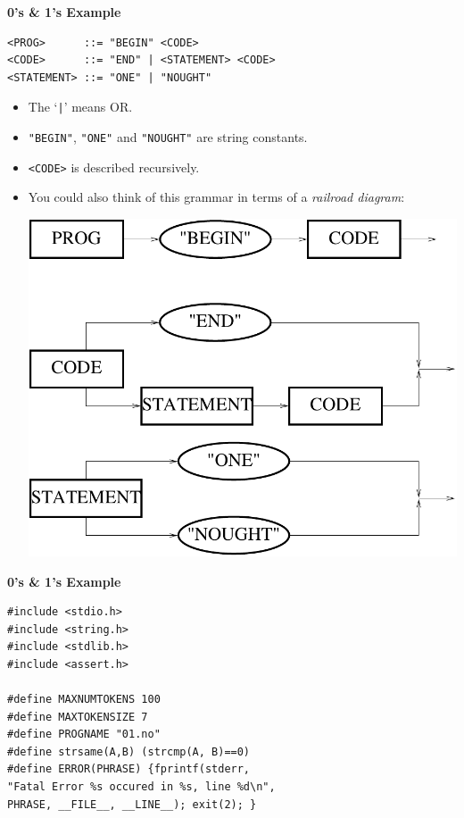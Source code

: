 \documentclass[a4,portraitt]{slides}
\begin{document}
{\newpage
{\samepage
\begin{center}
{\Large{\bf 0's \& 1's Example}}
\end{center}
{\small
\begin{verbatim}
<PROG>      ::= "BEGIN" <CODE>
<CODE>      ::= "END" | <STATEMENT> <CODE>
<STATEMENT> ::= "ONE" | "NOUGHT"
\end{verbatim}
\begin{itemize}
\item The `\verb^|^' means OR.
\item \verb^"BEGIN"^, \verb^"ONE"^ and \verb^"NOUGHT"^ are string constants.
\item \verb^<CODE>^ is described recursively.
\item You could also think of this grammar in terms of a {\it railroad diagram}:
\begin{center}
\includegraphics{../Images/railroad.pdf}
\end{center}
\end{itemize}
}}

\newpage
{\samepage
\begin{center}
{\Large{\bf 0's \& 1's Example}}
\end{center}
\begin{verbatim}
#include <stdio.h>
#include <string.h>
#include <stdlib.h>
#include <assert.h>

#define MAXNUMTOKENS 100
#define MAXTOKENSIZE 7
#define PROGNAME "01.no"
#define strsame(A,B) (strcmp(A, B)==0)
#define ERROR(PHRASE) {fprintf(stderr,
"Fatal Error %s occured in %s, line %d\n",
PHRASE, __FILE__, __LINE__); exit(2); }


\end{verbatim}}}
\end{document}
